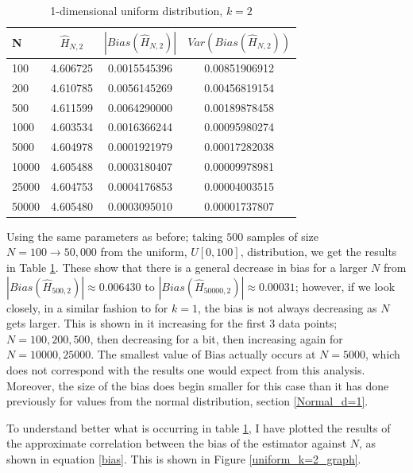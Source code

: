 \documentclass{article}
\begin{document}
\begin{table}
\caption{1-dimensional uniform distribution, $k=2$} \label{uniform_k=2_table}
\begin{center}
\begin{tabular}{| l | c c c|} 
\toprule
N & $\hat{H}_{N, 2}$ & $|Bias(\hat{H}_{N, 2})|$ & $Var(Bias(\hat{H}_{N, 2}))$ \\
\midrule[1pt]
100     & 4.606725     & 0.0015545396     & 0.00851906912  \\
200     & 4.610785     & 0.0056145269     & 0.00456819154  \\
500     & 4.611599     & 0.0064290000     & 0.00189878458  \\
1000    & 4.603534     & 0.0016366244     & 0.00095980274  \\
5000    & 4.604978     & 0.0001921979     & 0.00017282038  \\
10000   & 4.605488     & 0.0003180407     & 0.00009978981  \\
25000   & 4.604753     & 0.0004176853     & 0.00004003515  \\
50000   & 4.605480     & 0.0003095010     & 0.00001737807  \\
\hline
\end{tabular}
\end{center}
\end{table}

Using the same parameters as before; taking $500$ samples of size $N=100 \to 50,000$ from the uniform, $U[0, 100]$, distribution, we get the results in Table \ref{uniform_k=2_table}. These show that there is a general decrease in bias for a larger $N$ from $|Bias(\hat{H}_{500, 2})| \approx  0.006430$ to $|Bias(\hat{H}_{50000, 2})| \approx 0.00031$; however, if we look closely, in a similar fashion to for $k=1$, the bias is not always decreasing as $N$ gets larger. This is shown in it increasing for the first 3 data points; $N=100, 200 ,500$, then decreasing for a bit, then increasing again for $N = 10000, 25000$. The smallest value of Bias actually occurs at $N=5000$, which does not correspond with the results one would expect from this analysis. Moreover, the size of the bias does begin smaller for this case than it has done previously for values from the normal distribution, section \ref{Normal_d=1}. 

To understand better what is occurring in table \ref{uniform_k=2_table}, I have plotted the results of the approximate correlation between the bias of the estimator against $N$, as shown in equation \ref{bias}. This is shown in Figure \ref{uniform_k=2_graph}.
\end{document}
